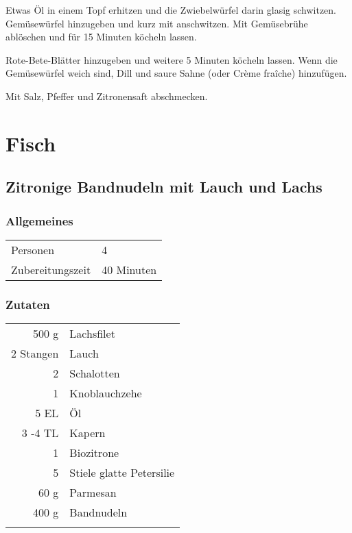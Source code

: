 Etwas Öl in einem Topf erhitzen und die Zwiebelwürfel darin glasig schwitzen. Gemüsewürfel hinzugeben und kurz mit anschwitzen. Mit Gemüsebrühe ablöschen und für 15 Minuten köcheln lassen.

Rote-Bete-Blätter hinzugeben und weitere 5 Minuten köcheln lassen. Wenn die Gemüsewürfel weich sind, Dill und saure Sahne (oder Crème fraîche) hinzufügen.

Mit Salz, Pfeffer und Zitronensaft abschmecken.



\section{Fisch}

\subsection{Zitronige Bandnudeln mit Lauch und Lachs}\label{sec:Lachs:LauchBandnudeln}
\subsubsection*{Allgemeines}
\begin{tabular}{ll}
    Personen         &  4   \\
    Zubereitungszeit & 40 Minuten  \\
\end{tabular} 
\subsubsection*{Zutaten}
\begin{tabular}{r l}
        500 g & Lachsfilet                     \\
    2 Stangen & Lauch                          \\
            2 & Schalotten                     \\
            1 & Knoblauchzehe                  \\
         5 EL & Öl                             \\
      3 -4 TL & Kapern                         \\
            1 & Biozitrone                     \\
            5 & Stiele       glatte Petersilie \\
         60 g & Parmesan                       \\
        400 g & Bandnudeln                     \\
              & 
\end{tabular}

